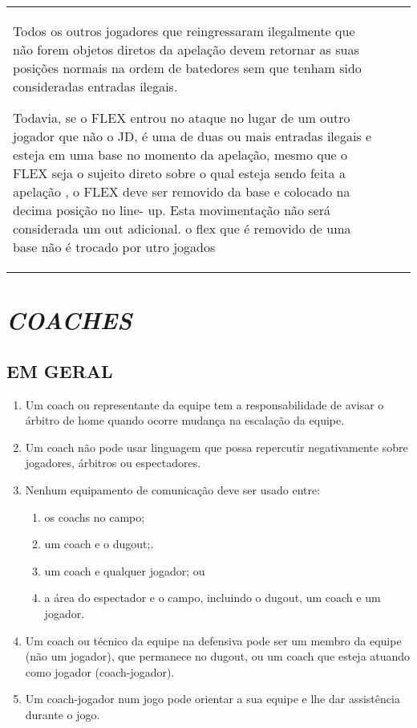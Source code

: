 \begin{landscape}
{\begin{tabular}{p{20mm}p{50mm}p{156mm}}
\begin{enumerate}[label=(\alph*), itemsep=-1mm]
				Todos os outros jogadores que reingressaram ilegalmente que não forem objetos diretos da apelação devem retornar as suas posições normais na ordem de batedores sem que tenham sido consideradas entradas ilegais.

				Todavia, se o FLEX entrou no ataque no lugar de um outro jogador que não o JD, é uma de duas ou mais entradas ilegais e esteja em uma base no momento da apelação, mesmo que o FLEX seja o sujeito direto sobre o qual esteja sendo feita a apelação , o FLEX deve ser removido da base e colocado na decima posição no line- up. Esta movimentação não será considerada um out adicional. o flex que é removido de uma base não é trocado por utro jogados
			\end{enumerate}
	\end{tabular}}
\end{landscape}

\section{\textit{COACHES}}
\subsection{EM GERAL}
\begin{enumerate}[label=(\alph*)]
	\item Um \gls{coach} ou representante da equipe tem a responsabilidade de avisar o árbitro de \gls{home} quando ocorre mudança na escalação da equipe.
	\item Um \gls{coach} não pode usar linguagem que possa repercutir negativamente sobre jogadores, árbitros ou espectadores.
	\item Nenhum equipamento de comunicação deve ser usado entre:
	\begin{enumerate}[label=\roman*.]
		\item os \glspl{coach} no campo;
		\item um \gls{coach} e o \gls{dugout};.
		\item um \gls{coach} e qualquer jogador; ou
		\item a área do espectador e o campo, incluindo o \gls{dugout}, um \gls{coach} e um jogador.
	\end{enumerate}
	\item Um \gls{coach} ou técnico da equipe na defensiva pode ser um membro da equipe (não um jogador), que permanece no \gls{dugout}, ou um \gls{coach} que esteja atuando como jogador (\gls{coach}-jogador).
	\item Um \gls{coach}-jogador num jogo pode orientar a sua equipe e lhe dar assistência durante o jogo.
\end{enumerate}


